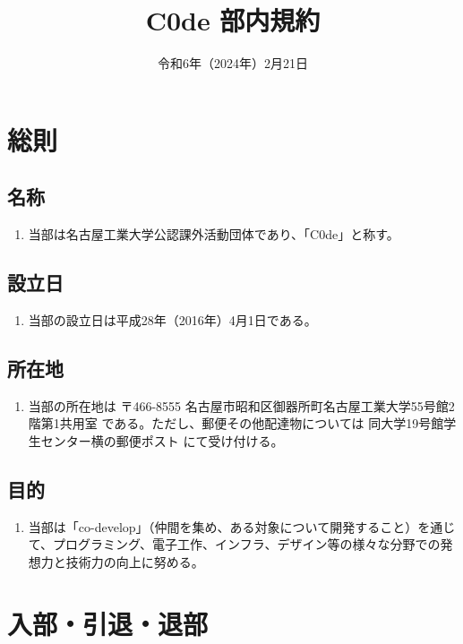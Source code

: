 \documentclass[12pt, unicode, a4paper]{ltjsreport}
\title{C0de 部内規約}
\date{令和6年（2024年）2月21日}
\begin{document}
\maketitle

\tableofcontents

\chapter{総則}
    \section{名称}
        \begin{enumerate}
            \item 当部は名古屋工業大学公認課外活動団体であり、「C0de」と称す。
        \end{enumerate}

    \section{設立日}
        \begin{enumerate}
            \item 当部の設立日は平成28年（2016年）4月1日である。
        \end{enumerate}

    \section{所在地}
        \begin{enumerate}
            \item 当部の所在地は 〒466-8555 名古屋市昭和区御器所町名古屋工業大学55号館2階第1共用室 である。ただし、郵便その他配達物については 同大学19号館学生センター横の郵便ポスト にて受け付ける。
        \end{enumerate}

    \section{目的}\label{purpose}
        \begin{enumerate}
            \item 当部は「co-develop」（仲間を集め、ある対象について開発すること）を通じて、プログラミング、電子工作、インフラ、デザイン等の様々な分野での発想力と技術力の向上に努める。
        \end{enumerate}


\chapter{入部・引退・退部}
\end{document}
